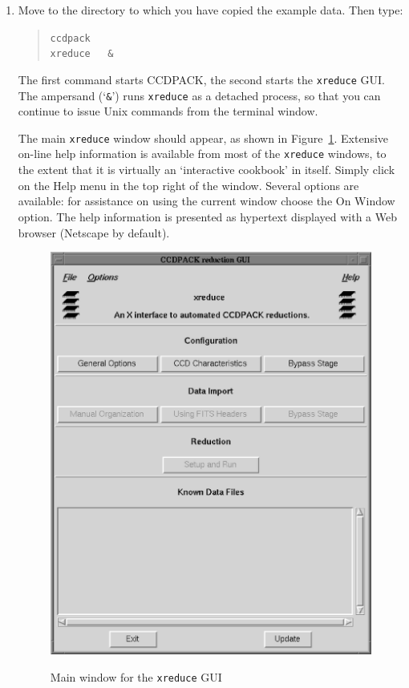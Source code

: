 \documentclass[twoside,11pt]{article}
\begin{document}
\begin{enumerate}

  \item Move to the directory to which you have copied the example data.
   Then type:

  \begin{quote}
   {\tt ccdpack \\
   xreduce ~ \&}
  \end{quote}

   The first command starts CCDPACK, the second starts the {\tt xreduce}
   GUI.  The ampersand (`{\tt \&}') runs {\tt xreduce} as a detached
   process, so that you can continue to issue Unix commands from the
   terminal window.

   The main {\tt xreduce} window should appear, as shown in
   Figure~\ref{XREDUCE}.  Extensive on-line help information is available
   from most of the {\tt xreduce} windows, to the extent that it is
   virtually an `interactive cookbook' in itself.  Simply click on the {\sf
   Help} menu in the top right of the window.  Several options are available:
   for assistance on using the current window choose the {\sf On Window}
   option.  The help information is presented as hypertext displayed with
   a Web browser (Netscape by default).

  \begin{figure}[htbp]
     \centering
      \includegraphics[totalheight=5in]{sc5_xreduce.ps}
      \begin{quote}
      \caption{Main window for the {\tt xreduce} GUI
      \label{XREDUCE} }
      \end{quote}
  \end{figure}


\end{enumerate}
\end{document}
